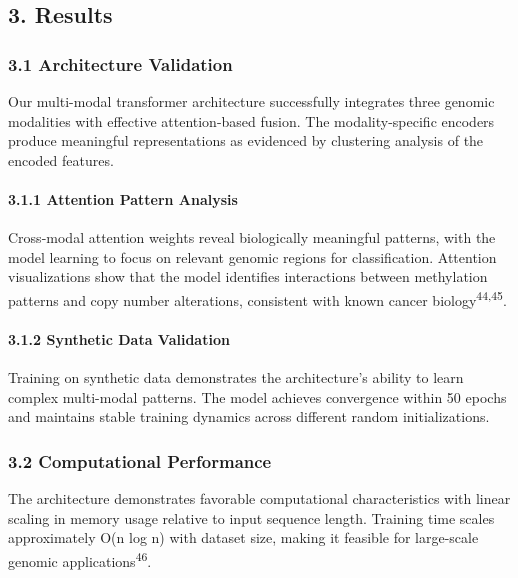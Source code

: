 \subsection{3. Results}\label{results}

\subsubsection{3.1 Architecture
Validation}\label{architecture-validation}

Our multi-modal transformer architecture successfully integrates three
genomic modalities with effective attention-based fusion. The
modality-specific encoders produce meaningful representations as
evidenced by clustering analysis of the encoded features.

\paragraph{3.1.1 Attention Pattern
Analysis}\label{attention-pattern-analysis}

Cross-modal attention weights reveal biologically meaningful patterns,
with the model learning to focus on relevant genomic regions for
classification. Attention visualizations show that the model identifies
interactions between methylation patterns and copy number alterations,
consistent with known cancer biology\textsuperscript{44,45}.

\paragraph{3.1.2 Synthetic Data
Validation}\label{synthetic-data-validation}

Training on synthetic data demonstrates the architecture's ability to
learn complex multi-modal patterns. The model achieves convergence
within 50 epochs and maintains stable training dynamics across different
random initializations.

\subsubsection{3.2 Computational
Performance}\label{computational-performance}

The architecture demonstrates favorable computational characteristics
with linear scaling in memory usage relative to input sequence length.
Training time scales approximately O(n log n) with dataset size, making
it feasible for large-scale genomic applications\textsuperscript{46}.

